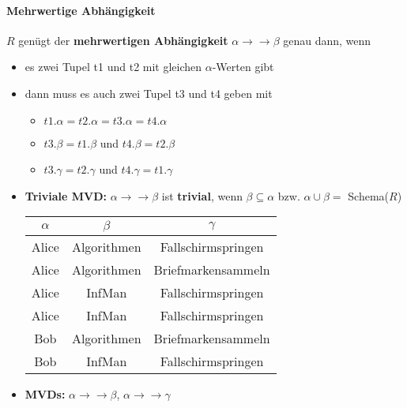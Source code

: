 		\paragraph{Mehrwertige Abhängigkeit}
			\(R\) genügt der \textbf{mehrwertigen Abhängigkeit} \( \alpha \rightarrow \rightarrow \beta\) genau dann, wenn
			\begin{itemize}
				\item es zwei Tupel t1 und t2 mit gleichen \(\alpha\)-Werten gibt
				\item dann muss es auch zwei Tupel t3 und t4 geben mit
					\begin{itemize}
						\item \(t1.\alpha = t2.\alpha = t3.\alpha = t4.\alpha\)
						\item \(t3.\beta = t1.\beta\) und \(t4.\beta = t2.\beta\)
						\item \(t3.\gamma = t2.\gamma\) und \(t4.\gamma = t1.\gamma\)
					\end{itemize}
				\item \textbf{Triviale MVD:} \(\alpha \rightarrow \rightarrow \beta\) ist \textbf{trivial}, wenn \(\beta \subseteq \alpha\) bzw. \(\alpha \cup \beta =\) Schema(\(R\))
					\begin{table}[H]
						\centering
						\begin{tabular}{c | c | c}
							\(\alpha\) & \(\beta\)   & \(\gamma\)         \\ \hline
							Alice      & Algorithmen & Fallschirmspringen \\
							Alice      & Algorithmen & Briefmarkensammeln \\
							Alice      & InfMan      & Fallschirmspringen \\
							Alice      & InfMan      & Fallschirmspringen \\
							Bob        & Algorithmen & Briefmarkensammeln \\
							Bob        & InfMan      & Fallschirmspringen
						\end{tabular}
					\end{table}
				\item \textbf{MVDs:} \(\alpha \rightarrow \rightarrow \beta\), \(\alpha \rightarrow \rightarrow \gamma\)
			\end{itemize}

